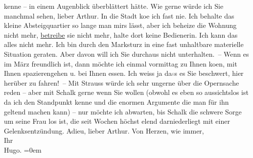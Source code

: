 \begin{ledgroupsized}[t]{13cm}
                    kenne – in einem Augenblick überblättert hätte.\pend
           \pstart
           Wie gerne würde ich Sie manchmal sehen, lieber Arthur. In die Stadt ko{\geminationm}e ich fast nie. Ich behalte das kleine
                    Absteigquartier so lange man mirs lässt, aber ich beheize die Wohnung nicht
                    mehr, \uline{betreibe} sie nicht mehr, halte dort keine
                    Bedienerin. Ich kann das alles nicht mehr. Ich bin durch den Marksturz in eine
                    fast unhaltbare materielle Situation geraten. Aber davon will {\pb}ich Sie durchaus nicht
                    unterhalten. – Wenn es im März freundlich ist, dann möchte ich
                    einmal vormittag zu Ihnen ko{\geminationm}en, mit Ihnen
                    spazierengehen u. bei Ihnen essen. Ich weiss ja da\textcolor{gray}{s}s es Sie beschwert, hier
                    herüber zu fahren! –\pend
           \pstart
           Mit Strauss würde ich sehr ungerne über die
                        Opernsache reden – aber
                    mit Schalk gerne wenn Sie wollen (obwohl es
                    eben so aussichtslos ist da ich den Standpunkt kenne und die enormen Argumente
                    die man für ihn geltend machen kann) – nur möchte ich abwarten, bis Schalk die schwere Sorge um seine Frau los ist, die seit
                    Wochen höchst elend darniederliegt mit einer Gelenksentzündung.\pend
           \pstart
           Adieu, lieber Arthur.\pend
           \pstart
           Von Herzen, wie immer,{\\[\baselineskip]}Ihr{\\[\baselineskip]}\spacefill\mbox{Hugo.}\pend
           \leftskip=0em{}\endnumbering{}\end{ledgroupsized}  \newcommand{\dateiname}{L02396}\newcommand{\titel}{Hugo Hofmannsthal an Arthur Schnitzler, 16. 1. 1923}\newcommand{\editorInnen}{Martin Anton Müller und Gerd-Hermann Susen}
            \footnotesize
\begin{ledgroupsized}[t]{11.5cm}
\end{ledgroupsized}
         
      
